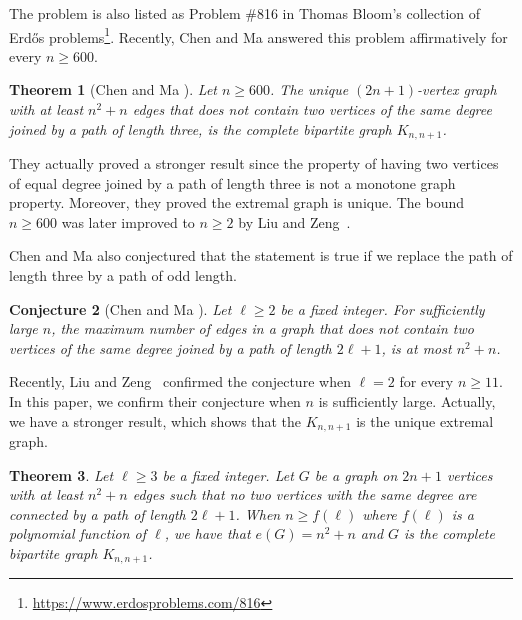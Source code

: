 \documentclass[12pt]{article}%
\newtheorem{theorem}{Theorem}[section]
\newtheorem{conjecture}[theorem]{Conjecture}
\begin{document}
The problem is also listed as Problem \#816 in Thomas Bloom's collection of Erd\H{o}s problems\footnote{\url{https://www.erdosproblems.com/816}}.
Recently, Chen and Ma \cite{CHEN20261} answered this problem affirmatively for every $n \ge 600$.

\begin{theorem}[Chen and Ma \cite{CHEN20261}]
	Let $n \ge 600$. The unique $(2n+1)$-vertex graph with at least $n^2+n$ edges that does not contain two vertices of the same degree joined by a path of length three, is the complete bipartite graph $K_{n,n+1}$.
\end{theorem}

They actually proved a stronger result since the property of having two vertices of equal degree joined by a path of length three is not a monotone graph property.
Moreover, they proved the extremal graph is unique.
The bound $n \ge 600$ was later improved to $n \ge 2$ by Liu and Zeng~\cite{2025arXiv250500523L}.

Chen and Ma also conjectured that the statement is true if we replace the path of length three by a path of odd length.
\begin{conjecture}[Chen and Ma \cite{CHEN20261}]
	Let $\ell \ge 2$ be a fixed integer.
	For sufficiently large $n$, the maximum number of edges in a graph that does not contain two vertices of the same degree joined by a path of length $2\ell+1$, is at most $n^2+n$.
\end{conjecture}

Recently, Liu and Zeng~\cite{2026arXiv260411664L} confirmed the conjecture when $\ell = 2$ for every $n \ge 11$.
In this paper, we confirm their conjecture when $n$ is sufficiently large.
Actually, we have a stronger result, which shows that the $K_{n,n+1}$ is the unique extremal graph.

\begin{theorem}\label{thm: main 2n+1}
	Let $\ell \ge 3$ be a fixed integer.
	Let $G$ be a graph on $2n+1$ vertices with at least $n^2+n$ edges such that no two vertices with the same degree are connected by a path of length $2\ell+1$.
	When $n \ge f(\ell)$ where $f(\ell)$ is a polynomial function of $\ell$, we have that $e(G) = n^2+n$ and $G$ is the complete bipartite graph $K_{n,n+1}$.
\end{theorem}



\end{document}

